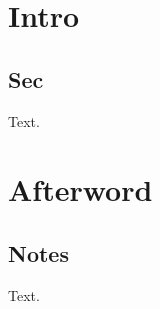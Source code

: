 \documentclass{svmult}
\begin{document}
\mainmatter
\chapter{Intro}
\section{Sec}
Text.
\backmatter
\chapter{Afterword}
\section{Notes}
Text.
\end{document}
